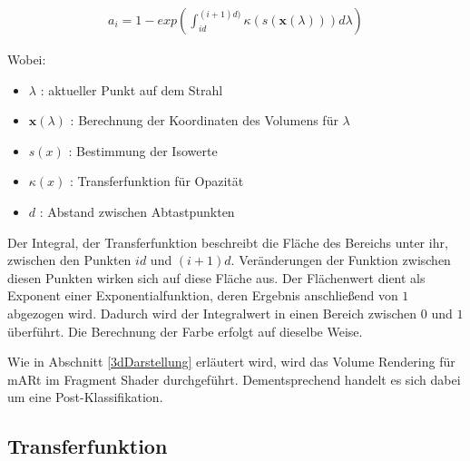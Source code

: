 \begin{align}
   a_i = 1-exp\left ( \int_{id}^{(i+1)d)} \kappa\left ( s(\mathbf{x}(\lambda)) \right ) d\lambda  \right )
\end{align}

Wobei:
\begin{itemize}
\item $\lambda$ 			: aktueller Punkt auf dem Strahl
\item $\mathbf{x}(\lambda)$ : Berechnung der Koordinaten des Volumens für $\lambda$
\item $s(x)$				: Bestimmung der Isowerte
\item $\kappa(x)$			: Transferfunktion für Opazität
\item $d$					: Abstand zwischen Abtastpunkten
\end{itemize}
 

Der Integral, der Transferfunktion beschreibt die Fläche des Bereichs unter ihr, zwischen den Punkten $id$ und $(i+1)d$. Veränderungen der Funktion zwischen diesen Punkten wirken sich auf diese Fläche aus. 
Der Flächenwert dient als Exponent einer Exponentialfunktion, deren Ergebnis anschließend von $1$ abgezogen wird. Dadurch wird der Integralwert in einen Bereich zwischen $0$ und $1$ überführt. 
Die Berechnung der Farbe erfolgt auf dieselbe Weise.

Wie in Abschnitt \ref{3dDarstellung} erläutert wird, wird das Volume Rendering für mARt im Fragment Shader durchgeführt. Dementsprechend handelt es sich dabei um eine Post-Klassifikation.

\subsection{Transferfunktion}

